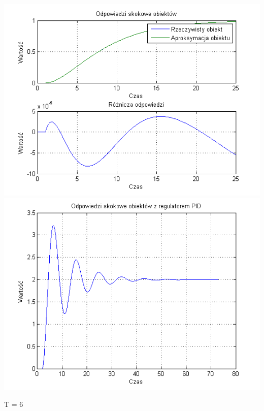 \documentclass[10pt,a4paper]{article}
\begin{document}
\begin{center}
\includegraphics[scale=1]{images/dwa/skrypt_67.png}\\
\includegraphics[scale=1]{images/dwa/skrypt_68.png}\\
\end{center}
\newpage
T = 6
\end{document}
